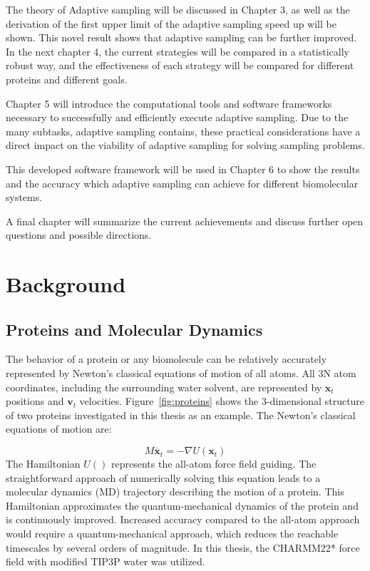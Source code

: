 The theory of Adaptive sampling will be discussed in Chapter 3, as well as the derivation of the first upper limit of the adaptive sampling speed up will be shown. This novel result shows that adaptive sampling can be further improved. 
In the next chapter 4, the current strategies will be compared in a statistically robust way, and the effectiveness of each strategy will be compared for different proteins and different goals.

Chapter 5 will introduce the computational tools and software frameworks necessary to successfully and efficiently execute adaptive sampling. Due to the many subtasks, adaptive sampling contains, these practical considerations have a direct impact on the viability of adaptive sampling for solving sampling problems.

This developed software framework will be used in Chapter 6 to show the results and the accuracy which adaptive sampling can achieve for different biomolecular systems. 

A final chapter will summarize the current achievements and discuss further open questions and possible directions.




\afterpage{\null\newpage}
\chapter{Background\label{sec:background}}

\section{Proteins and Molecular Dynamics}

The behavior of a protein or any biomolecule can be relatively accurately represented by Newton's classical equations of motion of all atoms. All 3N atom coordinates, including the surrounding water solvent, are represented by $\mathbf{x}_{t}$ positions and $\mathbf{v}_{t}$ velocities. Figure~\ref{fig:proteins} shows the 3-dimensional structure of two proteins investigated in this thesis as an example. The Newton's classical equations of motion are:

$$M\ddot{\mathbf{x}_{t}}=-\nabla U(\mathbf{x}_{t})$$
The Hamiltonian $U()$ represents the all-atom force field guiding. The straightforward approach of numerically solving this equation leads to a molecular dynamics (MD) trajectory describing the motion of a protein. This Hamiltonian approximates the quantum-mechanical dynamics of the protein and is continuously improved. Increased accuracy compared to the all-atom approach would require a quantum-mechanical approach, which reduces the reachable timescales by several orders of magnitude.  In this thesis, the CHARMM22* force field \cite{Charmm22star} with modified TIP3P water was utilized.

